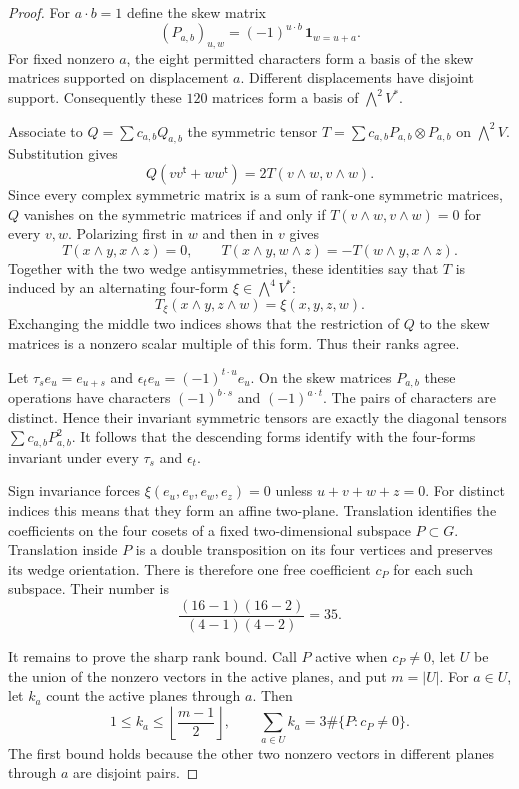 \documentclass[11pt]{article}
\theoremstyle{definition}
\theoremstyle{remark}
\begin{document}
\begin{proof}
For $a\cdot b=1$ define the skew matrix
\[
 (P_{a,b})_{u,w}=(-1)^{u\cdot b}\,\mathbf1_{w=u+a}.
\]
For fixed nonzero $a$, the eight permitted characters form a basis of the skew matrices supported on displacement $a$. Different displacements have disjoint support. Consequently these $120$ matrices form a basis of $\bigwedge^2V^*$.

Associate to $Q=\sum c_{a,b}Q_{a,b}$ the symmetric tensor
$T=\sum c_{a,b}P_{a,b}\otimes P_{a,b}$ on $\bigwedge^2V$. Substitution gives
\[
 Q(vv^{\mathsf t}+ww^{\mathsf t})=2T(v\wedge w,v\wedge w).
\]
Since every complex symmetric matrix is a sum of rank-one symmetric matrices, $Q$ vanishes on the symmetric matrices if and only if $T(v\wedge w,v\wedge w)=0$ for every $v,w$. Polarizing first in $w$ and then in $v$ gives
\[
 T(x\wedge y,x\wedge z)=0,\qquad
 T(x\wedge y,w\wedge z)=-T(w\wedge y,x\wedge z).
\]
Together with the two wedge antisymmetries, these identities say that $T$ is induced by an alternating four-form $\xi\in\bigwedge^4V^*$:
\[
 T_\xi(x\wedge y,z\wedge w)=\xi(x,y,z,w).
\]
Exchanging the middle two indices shows that the restriction of $Q$ to the skew matrices is a nonzero scalar multiple of this form. Thus their ranks agree.

Let $\tau_s e_u=e_{u+s}$ and $\epsilon_t e_u=(-1)^{t\cdot u}e_u$. On the skew matrices $P_{a,b}$ these operations have characters $(-1)^{b\cdot s}$ and $(-1)^{a\cdot t}$. The pairs of characters are distinct. Hence their invariant symmetric tensors are exactly the diagonal tensors $\sum c_{a,b}P_{a,b}^2$. It follows that the descending forms identify with the four-forms invariant under every $\tau_s$ and $\epsilon_t$.

Sign invariance forces $\xi(e_u,e_v,e_w,e_z)=0$ unless $u+v+w+z=0$. For distinct indices this means that they form an affine two-plane. Translation identifies the coefficients on the four cosets of a fixed two-dimensional subspace $P\subset G$. Translation inside $P$ is a double transposition on its four vertices and preserves its wedge orientation. There is therefore one free coefficient $c_P$ for each such subspace. Their number is
\[
 \frac{(16-1)(16-2)}{(4-1)(4-2)}=35.
\]

It remains to prove the sharp rank bound. Call $P$ active when $c_P\ne0$, let $U$ be the union of the nonzero vectors in the active planes, and put $m=|U|$. For $a\in U$, let $k_a$ count the active planes through $a$. Then
\begin{equation}\label{eq:plane-incidence}
 1\le k_a\le\left\lfloor\frac{m-1}{2}\right\rfloor,
 \qquad \sum_{a\in U}k_a=3\#\{P:c_P\ne0\}.
\end{equation}
The first bound holds because the other two nonzero vectors in different planes through $a$ are disjoint pairs.


\end{proof}
\end{document}
